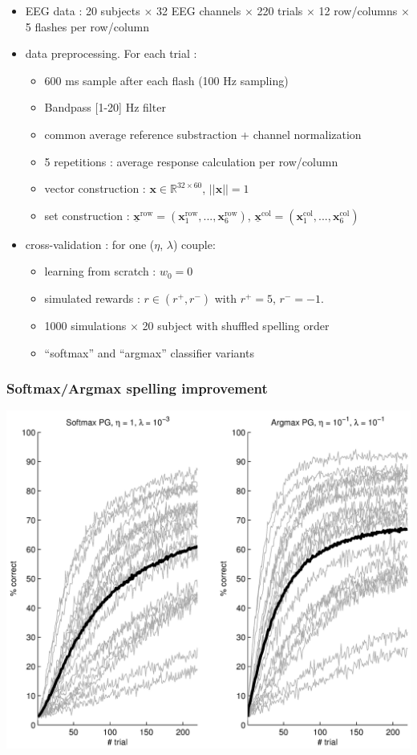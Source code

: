 \documentclass{beamer}
\begin{document}
\begin{frame}
 \begin{itemize}
  \item EEG data : 20 subjects $\times$ 32 EEG channels $\times$ 220 trials $\times$ 12 row/columns $\times$ 5 flashes per row/column 
  \item data preprocessing. For each trial :
  \begin{itemize}
   \item 600 ms sample after each flash (100 Hz sampling)
   \item Bandpass [1-20] Hz filter
   \item common average reference substraction + channel normalization 
   \item 5 repetitions : average response calculation per row/column 
   \item vector construction : $\boldsymbol{x} \in \mathbb{R}^{32 \times 60}$, $||\boldsymbol{x}||=1$
   \item set construction : $\underline{\mathbf{x}}^\text{row} = (\boldsymbol{x}_1^\text{row}, ..., \boldsymbol{x}_6^\text{row})$, 
   $\underline{\mathbf{x}}^\text{col} = (\boldsymbol{x}_1^\text{col}, ..., \boldsymbol{x}_6^\text{col})$
  \end{itemize}
  \item cross-validation : for one ($\eta$, $\lambda$) couple:
  \begin{itemize}
    \item learning from scratch : $w_0 = 0$
    \item simulated rewards : $r \in (r^+, r^-)$ with $r^+ = 5$, $r^- = -1$.
    \item 1000 simulations $\times$ 20 subject with shuffled spelling order
    \item ``softmax'' and ``argmax'' classifier variants
  \end{itemize}
 \end{itemize}
\end{frame}

\begin{frame}\frametitle{Softmax/Argmax spelling improvement}
\centerline{\includegraphics[width=0.7\linewidth]{PG_softmax.png}}
\end{frame}
\end{document}
